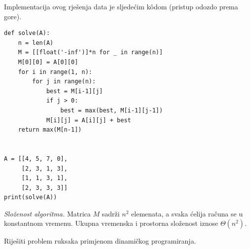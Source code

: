 Implementacija ovog rješenja data je sljedećim k\^odom (pristup odozdo prema gore).

\begin{verbatim}
def solve(A):
    n = len(A)
    M = [[float('-inf')]*n for _ in range(n)]
    M[0][0] = A[0][0]
    for i in range(1, n):
        for j in range(n):
            best = M[i-1][j]
            if j > 0:
                best = max(best, M[i-1][j-1])
            M[i][j] = A[i][j] + best
    return max(M[n-1])


A = [[4, 5, 7, 0],
     [2, 3, 1, 3],
     [1, 1, 3, 1],
     [2, 3, 3, 3]]
print(solve(A))
\end{verbatim}

\textit{Složenost algoritma.} Matrica $M$ sadrži $n^2$ elemenata, a svaka ćelija računa se u konstantnom vremenu. Ukupna vremenska i prostorna složenost iznose $\Theta(n^2)$.

\begin{example}
	Riješiti problem ruksaka primjenom dinamičkog programiranja.
\end{example}

